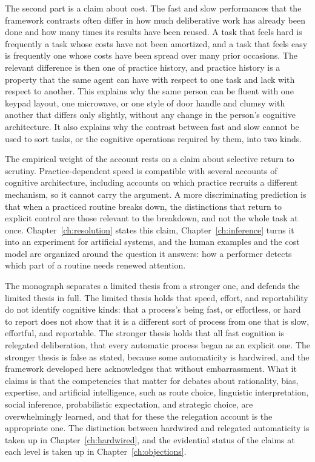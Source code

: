 \documentclass[11pt]{report}
\theoremstyle{remark}
\theoremstyle{definition}
\begin{document}
The second part is a claim about cost. The fast and slow performances that the framework contrasts often differ in how much deliberative work has already been done and how many times its results have been reused. A task that feels hard is frequently a task whose costs have not been amortized, and a task that feels easy is frequently one whose costs have been spread over many prior occasions. The relevant difference is then one of practice history, and practice history is a property that the same agent can have with respect to one task and lack with respect to another. This explains why the same person can be fluent with one keypad layout, one microwave, or one style of door handle and clumsy with another that differs only slightly, without any change in the person's cognitive architecture. It also explains why the contrast between fast and slow cannot be used to sort tasks, or the cognitive operations required by them, into two kinds.

The empirical weight of the account rests on a claim about selective return to scrutiny. Practice-dependent speed is compatible with several accounts of cognitive architecture, including accounts on which practice recruits a different mechanism, so it cannot carry the argument. A more discriminating prediction is that when a practiced routine breaks down, the distinctions that return to explicit control are those relevant to the breakdown, and not the whole task at once. Chapter~\ref{ch:resolution} states this claim, Chapter~\ref{ch:inference} turns it into an experiment for artificial systems, and the human examples and the cost model are organized around the question it answers: how a performer detects which part of a routine needs renewed attention.

The monograph separates a limited thesis from a stronger one, and defends the limited thesis in full. The limited thesis holds that speed, effort, and reportability do not identify cognitive kinds: that a process's being fast, or effortless, or hard to report does not show that it is a different sort of process from one that is slow, effortful, and reportable. The stronger thesis holds that all fast cognition is relegated deliberation, that every automatic process began as an explicit one. The stronger thesis is false as stated, because some automaticity is hardwired, and the framework developed here acknowledges that without embarrassment. What it claims is that the competencies that matter for debates about rationality, bias, expertise, and artificial intelligence, such as route choice, linguistic interpretation, social inference, probabilistic expectation, and strategic choice, are overwhelmingly learned, and that for these the relegation account is the appropriate one. The distinction between hardwired and relegated automaticity is taken up in Chapter~\ref{ch:hardwired}, and the evidential status of the claims at each level is taken up in Chapter~\ref{ch:objections}.
\end{document}

